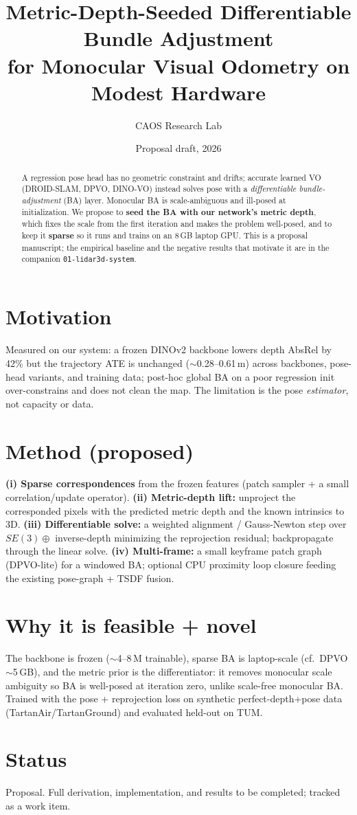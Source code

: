 \documentclass[10pt,twocolumn]{article}
\title{\textbf{Metric-Depth-Seeded Differentiable Bundle Adjustment\\ for Monocular Visual Odometry on Modest Hardware}}
\author{CAOS Research Lab}
\date{Proposal draft, 2026}
\begin{document}
\maketitle

\begin{abstract}
A regression pose head has no geometric constraint and drifts; accurate learned VO (DROID-SLAM, DPVO, DINO-VO)
instead solves pose with a \emph{differentiable bundle-adjustment} (BA) layer. Monocular BA is scale-ambiguous and
ill-posed at initialization. We propose to \textbf{seed the BA with our network's metric depth}, which fixes the
scale from the first iteration and makes the problem well-posed, and to keep it \textbf{sparse} so it runs and trains
on an 8\,GB laptop GPU. This is a proposal manuscript; the empirical baseline and the negative results that motivate
it are in the companion \texttt{01-lidar3d-system}.
\end{abstract}

\section{Motivation}
Measured on our system: a frozen DINOv2 backbone lowers depth AbsRel by 42\% but the trajectory ATE is unchanged
($\sim$0.28--0.61\,m) across backbones, pose-head variants, and training data; post-hoc global BA on a poor
regression init over-constrains and does not clean the map. The limitation is the pose \emph{estimator}, not
capacity or data.

\section{Method (proposed)}
\textbf{(i) Sparse correspondences} from the frozen features (patch sampler + a small correlation/update operator).
\textbf{(ii) Metric-depth lift:} unproject the corresponded pixels with the predicted metric depth and the known
intrinsics to 3D. \textbf{(iii) Differentiable solve:} a weighted alignment / Gauss-Newton step over
$SE(3)\oplus$ inverse-depth minimizing the reprojection residual; backpropagate through the linear solve.
\textbf{(iv) Multi-frame:} a small keyframe patch graph (DPVO-lite) for a windowed BA; optional CPU proximity loop
closure feeding the existing pose-graph + TSDF fusion.

\section{Why it is feasible + novel}
The backbone is frozen ($\sim$4--8\,M trainable), sparse BA is laptop-scale (cf.\ DPVO $\sim$5\,GB), and the metric
prior is the differentiator: it removes monocular scale ambiguity so BA is well-posed at iteration zero, unlike
scale-free monocular BA. Trained with the pose + reprojection loss on synthetic perfect-depth+pose data
(TartanAir/TartanGround) and evaluated held-out on TUM.

\section*{Status}
Proposal. Full derivation, implementation, and results to be completed; tracked as a work item.
\end{document}
